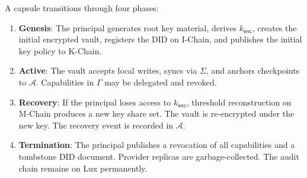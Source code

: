 A capsule transitions through four phases:

\begin{enumerate}[nosep]
  \item \textbf{Genesis}: The principal generates root key material, derives
        $k_{\mathsf{enc}}$, creates the initial encrypted vault, registers the
        DID on I-Chain, and publishes the initial key policy to K-Chain.
  \item \textbf{Active}: The vault accepts local writes, syncs via $\Sigma$,
        and anchors checkpoints to $\mathcal{A}$. Capabilities in $\Gamma$
        may be delegated and revoked.
  \item \textbf{Recovery}: If the principal loses access to $k_{\mathsf{enc}}$,
        threshold reconstruction on M-Chain produces a new key share set.
        The vault is re-encrypted under the new key. The recovery event is
        recorded in $\mathcal{A}$.
  \item \textbf{Termination}: The principal publishes a revocation of all
        capabilities and a tombstone DID document. Provider replicas are
        garbage-collected. The audit chain remains on Lux permanently.
\end{enumerate}

